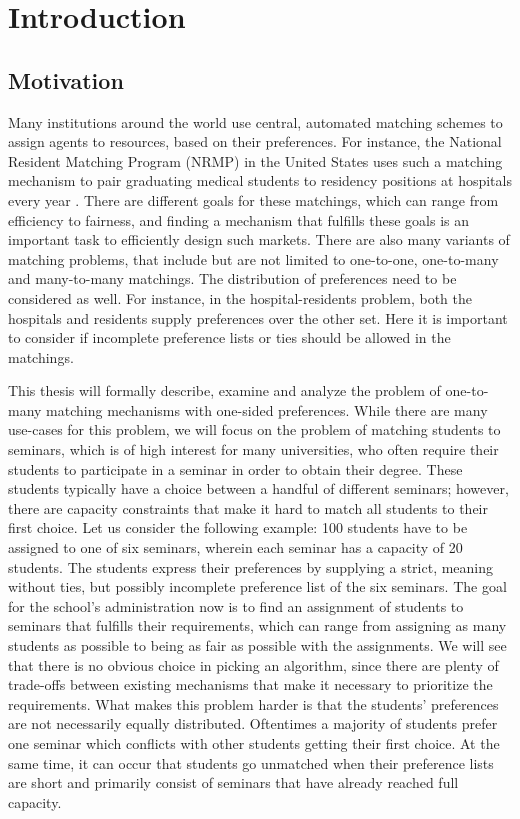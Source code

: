 \section{Introduction}
\label{sec:introduction}

\subsection{Motivation}
Many institutions around the world use central, automated matching schemes to assign agents to resources, based on their preferences. For instance, the National Resident Matching Program (NRMP) in the United States uses such a matching mechanism to pair graduating medical students to residency positions at hospitals every year \cite{Roth-NRMP}. There are different goals for these matchings, which can range from efficiency to fairness, and finding a mechanism that fulfills these goals is an important task to efficiently design such markets.
There are also many variants of matching problems, that include but are not limited to one-to-one, one-to-many and many-to-many matchings. The distribution of preferences need to be considered as well. For instance, in the hospital-residents problem, both the hospitals and residents supply preferences over the other set. Here it is important to consider if incomplete preference lists or ties should be allowed in the matchings. 

This thesis will formally describe, examine and analyze the problem of one-to-many matching mechanisms with one-sided preferences. While there are many use-cases for this problem, we will focus on the problem of matching students to seminars, which is of high interest for many universities, who often require their students to participate in a seminar in order to obtain their degree. These students typically have a choice between a handful of different seminars; however, there are capacity constraints that make it hard to match all students to their first choice. Let us consider the following example: 100 students have to be assigned to one of six seminars, wherein each seminar has a capacity of 20 students. The students express their preferences by supplying a strict, meaning without ties, but possibly incomplete preference list of the six seminars. The goal for the school's administration now is to find an assignment of students to seminars that fulfills their requirements, which can range from assigning as many students as possible to being as fair as possible with the assignments. We will see that there is no obvious choice in picking an algorithm, since there are plenty of trade-offs between existing mechanisms that make it necessary to prioritize the requirements.  
What makes this problem harder is that the students' preferences are not necessarily equally distributed. Oftentimes a majority of students prefer one seminar which conflicts with other students getting their first choice. At the same time, it can occur that students go unmatched when their preference lists are short and primarily consist of seminars that have already reached full capacity.

